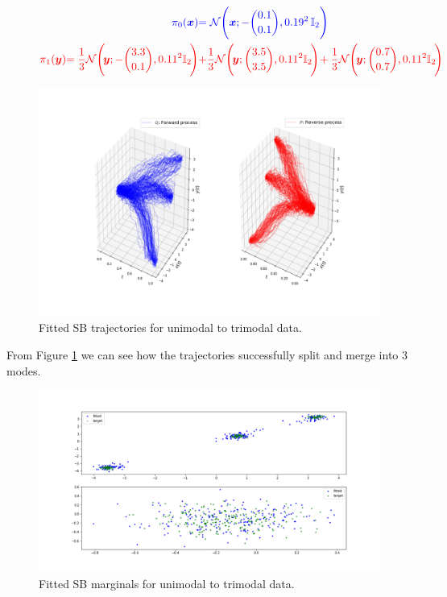 \documentclass[a4paper,12pt,twoside,openright]{report}
\theoremstyle{definition}
\begin{document}
\begin{figure}[H]
\begin{adjustbox}{width=\columnwidth}
\parbox{\linewidth}{
\begin{align*}
    \color{blue}{\pi_0({\bm{x}})} &\color{blue}{= {\mathcal{N}}\Bigg({\bm{x}}; -{0.1\choose0.1},  0.19^2\, \mathbb{I}_2 \Bigg)} \\
    \color{red}{\pi_1({\bm{y}})} \color{red}{= \frac{1}{3}{\mathcal{N}}\Bigg(\!{\bm{y}}; -{3.3\choose0.1}, 0.11^2\mathbb{I}_2\!\Bigg)}&\color{red}{ + \frac{1}{3}{\mathcal{N}}\Bigg(\!{\bm{y}}; {3.5\choose3.5}, 0.11 ^2\mathbb{I}_2\!\Bigg)}\!+\color{red}{ \frac{1}{3}{\mathcal{N}}\Bigg(\!{\bm{y}}; {0.7\choose0.7}, 0.11 ^2\mathbb{I}_2\!\Bigg)}
\end{align*}
}
\end{adjustbox}
\end{figure}
\begin{figure}
    \centering
    \includegraphics[scale=0.4,trim={5.3cm 1cm 2.5cm 0}, clip]{images/GP/2d_3mode_GP_means_3.3_3.6_0.7_std_0.1_200.png}
    \caption{ Fitted SB trajectories for unimodal to trimodal data.  }
    \label{fig:3mode2d200trajectroies2d}
\end{figure}
From Figure \ref{fig:3mode2d200trajectroies2d}  we can see how the trajectories successfully split and merge into 3 modes.
\begin{figure}
    \centering
    \includegraphics[scale=0.4,trim={2.3cm 1cm 2.5cm 0}, clip]{images/GP/2d_3mode_GP_means_3.3_3.6_0.7_std_0.1_scatter_200_.png}
    \caption{ Fitted SB marginals for unimodal to trimodal data.  }
    \label{fig:3mode2d200}
\end{figure}
\end{document}
